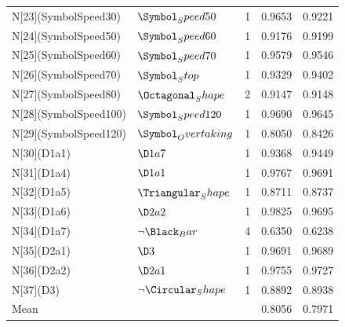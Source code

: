 \begin{tabular}{lllll}
N[23](SymbolSpeed30) & $\Symbol_Speed50$ & 1 & 0.9653 & 0.9221 \\
N[24](SymbolSpeed50) & $\Symbol_Speed60$ & 1 & 0.9176 & 0.9199 \\
N[25](SymbolSpeed60) & $\Symbol_Speed70$ & 1 & 0.9579 & 0.9546 \\
N[26](SymbolSpeed70) & $\Symbol_Stop$ & 1 & 0.9329 & 0.9402 \\
N[27](SymbolSpeed80) & $\Octagonal_Shape$ & 2 & 0.9147 & 0.9148 \\
N[28](SymbolSpeed100) & $\Symbol_Speed120$ & 1 & 0.9690 & 0.9645 \\
N[29](SymbolSpeed120) & $\Symbol_Overtaking$ & 1 & 0.8050 & 0.8426 \\
N[30](D1a1) & $\D1a7$ & 1 & 0.9368 & 0.9449 \\
N[31](D1a4) & $\D1a1$ & 1 & 0.9767 & 0.9691 \\
N[32](D1a5) & $\Triangular_Shape$ & 1 & 0.8711 & 0.8737 \\
N[33](D1a6) & $\D2a2$ & 1 & 0.9825 & 0.9695 \\
N[34](D1a7) & $\neg \Black_Bar$ & 4 & 0.6350 & 0.6238 \\
N[35](D2a1) & $\D3$ & 1 & 0.9691 & 0.9689 \\
N[36](D2a2) & $\D2a1$ & 1 & 0.9755 & 0.9727 \\
N[37](D3) & $\neg \Circular_Shape$ & 1 & 0.8892 & 0.8938 \\
Mean &  &  & 0.8056 & 0.7971 \\
\bottomrule
\end{tabular}
